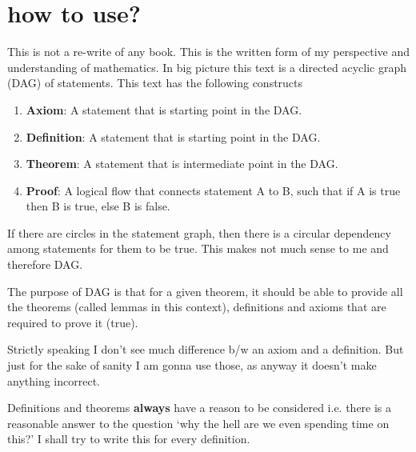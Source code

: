 \documentclass[./main.tex]{subfiles}
\begin{document}
\chapter*{how to use?}
This is not a re-write of any book.
This is the written form of my perspective and understanding of mathematics.
In big picture this text is a directed acyclic graph (DAG) of statements.
This text has the following constructs
\begin{enumerate}
  \item \textbf{Axiom}: A statement that is starting point in the DAG.
  \item \textbf{Definition}: A statement that is starting point in the DAG.
  \item \textbf{Theorem}: A statement that is intermediate point in the DAG.
  \item \textbf{Proof}: A logical flow that connects statement A to B, such that if A is true then B is true, else B is false.
\end{enumerate}

If there are circles in the statement graph, then there is a circular dependency among statements for them to be true. This makes not much sense to me and therefore DAG.

The purpose of DAG is that for a given theorem, it should be able to provide all the theorems (called lemmas in this context), definitions and axioms that are required to prove it (true).

Strictly speaking I don't see much difference b/w an axiom and a definition.
But just for the sake of sanity I am gonna use those, as anyway it doesn't make anything incorrect.

Definitions and theorems \textbf{always} have a reason to be considered i.e. there is a reasonable answer to the question `why the hell are we even spending time on this?' I shall try to write this for every definition.
\end{document}
